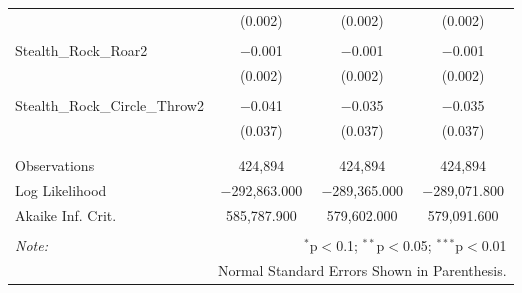 \documentclass[12pt,twoside]{reedthesis}
\begin{document}
\begin{table}[!htbp]
\begin{tabular}{@{\extracolsep{5pt}}lccc}
    & (0.002) & (0.002) & (0.002) \\ 
    & & & \\ 
   Stealth\_Rock\_Roar2 & $-$0.001 & $-$0.001 & $-$0.001 \\ 
    & (0.002) & (0.002) & (0.002) \\ 
    & & & \\ 
   Stealth\_Rock\_Circle\_Throw2 & $-$0.041 & $-$0.035 & $-$0.035 \\ 
    & (0.037) & (0.037) & (0.037) \\ 
    & & & \\ 
  \hline \\[-1.8ex] 
  Observations & 424,894 & 424,894 & 424,894 \\ 
  Log Likelihood & $-$292,863.000 & $-$289,365.000 & $-$289,071.800 \\ 
  Akaike Inf. Crit. & 585,787.900 & 579,602.000 & 579,091.600 \\ 
  \hline 
  \hline \\[-1.8ex] 
  \textit{Note:}  & \multicolumn{3}{r}{$^{*}$p$<$0.1; $^{**}$p$<$0.05; $^{***}$p$<$0.01} \\ 
   & \multicolumn{3}{r}{Normal Standard Errors Shown in Parenthesis.} \\ 
  \end{tabular} 
  \end{table}
  
\end{document}
